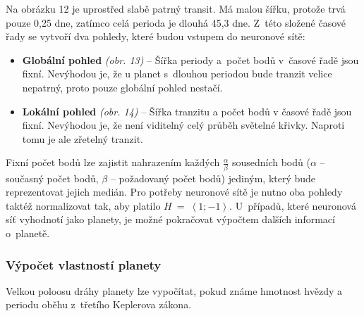 \documentclass[a4paper,12pt]{article}
\begin{document}
\begin{multicols}{2}
\end{multicols}

Na obrázku 12 je uprostřed slabě patrný transit. Má malou šířku, protože trvá pouze 0,25 dne, zatímco celá perioda je dlouhá 45,3 dne. Z~této složené časové řady se vytvoří dva pohledy, které budou vstupem do neuronové sítě:

\begin{itemize}
\item \textbf{Globální pohled} \emph{(obr. 13)} -- Šířka periody a~počet bodů v~časové řadě jsou fixní. Nevýhodou je, že u planet s~dlouhou periodou bude tranzit velice nepatrný, proto pouze globální pohled nestačí.~\cite{kepler80}
\item \textbf{Lokální pohled} \emph{(obr. 14)} -- Šířka tranzitu a počet bodů v časové řadě jsou fixní. Nevýhodou je, že není viditelný celý průběh světelné křivky. Naproti tomu je ale zřetelný tranzit.~\cite{kepler80}
\end{itemize}

\begin{multicols}{2}
\nasa
\end{multicols}

Fixní počet bodů lze zajistit nahrazením každých $\frac{\alpha}{\beta}$ sousedních bodů ($\alpha$ -- současný počet bodů, $\beta$ -- požadovaný počet bodů) jediným, který bude reprezentovat jejich medián. Pro potřeby neuronové sítě je nutno oba pohledy taktéž normalizovat tak, aby platilo $H~=~\left<1; -1\right>$. U~případů, které neuronová síť vyhodnotí jako planety, je možné pokračovat výpočtem dalších informací o~planetě.~\cite{kepler80}

\subsubsection{Výpočet vlastností planety}

Velkou poloosu dráhy planety lze vypočítat, pokud známe hmotnost hvězdy a periodu oběhu z~třetího Keplerova zákona.~\cite{transitprops}

\end{document}
